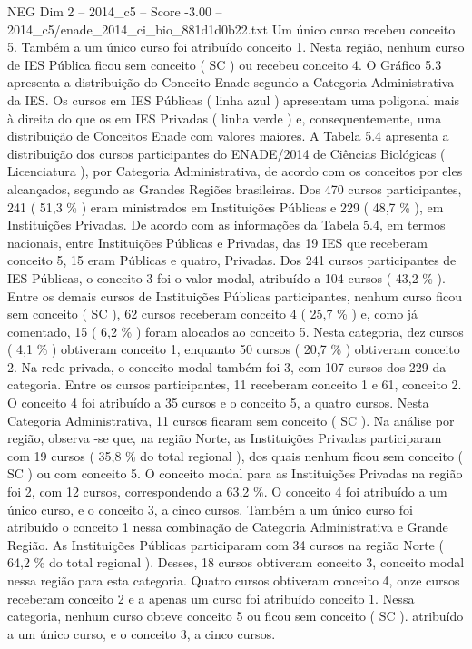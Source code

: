\begin{textsample}{NEG Dim 2 – 2014\_c5 – Score -3.00 – 2014\_c5/enade\_2014\_ci\_bio\_881d1d0b22.txt}
Um único curso recebeu conceito 5.
Também a um único curso foi atribuído conceito 1.
Nesta região, nenhum curso de IES Pública ficou sem conceito ( SC ) ou recebeu conceito 4.
O Gráfico 5.3 apresenta a distribuição do Conceito Enade segundo a Categoria Administrativa da IES.
Os cursos em IES Públicas ( linha azul ) apresentam uma poligonal mais à direita do que os em IES Privadas ( linha verde ) e, consequentemente, uma distribuição de Conceitos Enade com valores maiores.
A Tabela 5.4 apresenta a distribuição dos cursos participantes do ENADE/2014 de Ciências Biológicas ( Licenciatura ), por Categoria Administrativa, de acordo com os conceitos por eles alcançados, segundo as Grandes Regiões brasileiras.
Dos 470 cursos participantes, 241 ( 51,3 \% ) eram ministrados em Instituições Públicas e 229 ( 48,7 \% ), em Instituições Privadas.
De acordo com as informações da Tabela 5.4, em termos nacionais, entre Instituições Públicas e Privadas, das 19 IES que receberam conceito 5, 15 eram Públicas e quatro, Privadas.
Dos 241 cursos participantes de IES Públicas, o conceito 3 foi o valor modal, atribuído a 104 cursos ( 43,2 \% ).
Entre os demais cursos de Instituições Públicas participantes, nenhum curso ficou sem conceito ( SC ), 62 cursos receberam conceito 4 ( 25,7 \% ) e, como já comentado, 15 ( 6,2 \% ) foram alocados ao conceito 5.
Nesta categoria, dez cursos ( 4,1 \% ) obtiveram conceito 1, enquanto 50 cursos ( 20,7 \% ) obtiveram conceito 2.
Na rede privada, o conceito modal também foi 3, com 107 cursos dos 229 da categoria.
Entre os cursos participantes, 11 receberam conceito 1 e 61, conceito 2.
O conceito 4 foi atribuído a 35 cursos e o conceito 5, a quatro cursos.
Nesta Categoria Administrativa, 11 cursos ficaram sem conceito ( SC ).
Na análise por região, observa -se que, na região Norte, as Instituições Privadas participaram com 19 cursos ( 35,8 \% do total regional ), dos quais nenhum ficou sem conceito ( SC ) ou com conceito 5.
O conceito modal para as Instituições Privadas na região foi 2, com 12 cursos, correspondendo a 63,2 \%.
O conceito 4 foi atribuído a um único curso, e o conceito 3, a cinco cursos.
Também a um único curso foi atribuído o conceito 1 nessa combinação de Categoria Administrativa e Grande Região.
As Instituições Públicas participaram com 34 cursos na região Norte ( 64,2 \% do total regional ).
Desses, 18 cursos obtiveram conceito 3, conceito modal nessa região para esta categoria.
Quatro cursos obtiveram conceito 4, onze cursos receberam conceito 2 e a apenas um curso foi atribuído conceito 1.
Nessa categoria, nenhum curso obteve conceito 5 ou ficou sem conceito ( SC ). atribuído a um único curso, e o conceito 3, a cinco cursos.

\end{textsample}
